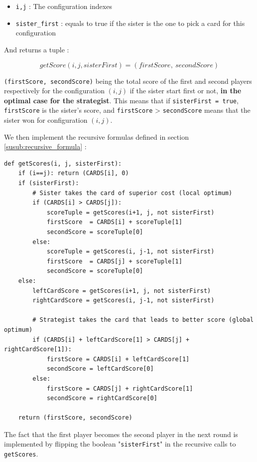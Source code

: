 \documentclass[a4paper,12pt,fleqn]{article}
\begin{document}
\begin{itemize}
    \item \texttt{i,j} : The configuration indexes
    \item \texttt{sister\_first} : equals to true if the sister is the one to pick a card for this configuration
\end{itemize}

And returns a tuple :

$$getScore(i, j, sisterFirst) = (firstScore,\ secondScore)$$

\noindent \texttt{(firstScore, secondScore)} being the total score of the first and second players respectively for the configuration $(i,j)$ if the sister start first or not, \textbf{in the optimal case for the strategist}.
This means that if \texttt{sisterFirst = true}, \texttt{firstScore} is the sister's score, and \texttt{firstScore} > \texttt{secondScore} means that the sister won for configuration $(i,j)$.

We then implement the recursive formulas defined in section \ref{susub:recursive_formula} :

\begin{verbatim}
def getScores(i, j, sisterFirst):
    if (i==j): return (CARDS[i], 0)
    if (sisterFirst):
        # Sister takes the card of superior cost (local optimum)
        if (CARDS[i] > CARDS[j]):
            scoreTuple = getScores(i+1, j, not sisterFirst)
            firstScore  = CARDS[i] + scoreTuple[1]
            secondScore = scoreTuple[0]
        else:
            scoreTuple = getScores(i, j-1, not sisterFirst)
            firstScore  = CARDS[j] + scoreTuple[1]
            secondScore = scoreTuple[0]
    else:
        leftCardScore = getScores(i+1, j, not sisterFirst)
        rightCardScore = getScores(i, j-1, not sisterFirst)

        # Strategist takes the card that leads to better score (global optimum)
        if (CARDS[i] + leftCardScore[1] > CARDS[j] + rightCardScore[1]):
            firstScore = CARDS[i] + leftCardScore[1]
            secondScore = leftCardScore[0]
        else:
            firstScore = CARDS[j] + rightCardScore[1]
            secondScore = rightCardScore[0]
    
    return (firstScore, secondScore)
\end{verbatim}

The fact that the first player becomes the second player in the next round is implemented by flipping the boolean "\texttt{sisterFirst}" in the recursive calls to \texttt{getScores}.
\end{document}
